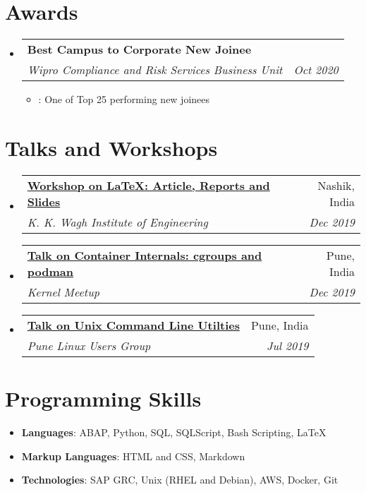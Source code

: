 \documentclass[letterpaper,11pt]{article}
\makeatletter
\newcommand{\resumeItem}[2]{
  \item\small{
    \textbf{#1}{: #2 \vspace{-2pt}}
  }
}
\newcommand{\resumeSubheading}[4]{
  \vspace{-1pt}\item
    \begin{tabular*}{0.97\textwidth}[t]{l@{\extracolsep{\fill}}r}
      \textbf{#1} & #2 \\
      \textit{\small#3} & \textit{\small #4} \\
    \end{tabular*}\vspace{-5pt}
}
\newcommand{\resumeSubSubheading}[2]{
    \begin{tabular*}{0.97\textwidth}{l@{\extracolsep{\fill}}r}
      \textit{\small#1} & \textit{\small #2} \\
    \end{tabular*}\vspace{-5pt}
}
\newcommand{\resumeSubHeadingListStart}{\begin{itemize}[leftmargin=*]}
\newcommand{\resumeSubHeadingListEnd}{\end{itemize}}
\newcommand{\resumeItemListStart}{\begin{itemize}}
\newcommand{\resumeItemListEnd}{\end{itemize}\vspace{-5pt}}
\makeatother
\begin{document}


\section{Awards}
  \resumeSubHeadingListStart
	  	\resumeSubheading
	  	  {Best Campus to Corporate New Joinee}{}
		  {Wipro Compliance and Risk Services Business Unit}{Oct 2020}
		  \resumeItemListStart
			  \resumeItem{}{One of Top 25 performing new joinees}
		  \resumeItemListEnd
  \resumeSubHeadingListEnd

\section{Talks and Workshops}
	\resumeSubHeadingListStart
	  	\resumeSubheading
		{\href{https://github.com/whereistejas/latex-workshop}{Workshop on LaTeX: Article, Reports and Slides}}{Nashik, India}
		  {K. K. Wagh Institute of Engineering}{Dec 2019}
	  	\resumeSubheading
		{\href{https://github.com/whereistejas/plug-containers-talk}{Talk on Container Internals: cgroups and podman}}{Pune, India}
		  {Kernel Meetup}{Dec 2019}
	  	\resumeSubheading
		{\href{https://github.com/whereistejas/plug-command-line}{Talk on Unix Command Line Utilties}}{Pune, India}
		  {Pune Linux Users Group}{Jul 2019}
	\resumeSubHeadingListEnd

\section{Programming Skills}
	\resumeSubHeadingListStart
		\item{\textbf{Languages}{: ABAP, Python, SQL, SQLScript, Bash Scripting, LaTeX} }
			\hfill
		\item{\textbf{Markup Languages}{: HTML and CSS, Markdown} }
			\hfill
		\item{\textbf{Technologies}{: SAP GRC, Unix (RHEL and Debian), AWS, Docker, Git} }
			\hfill
	\resumeSubHeadingListEnd

\end{document}
